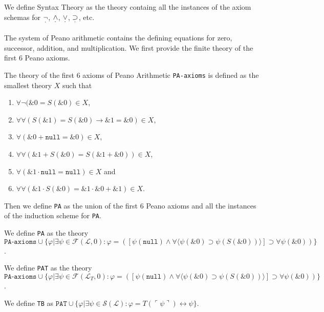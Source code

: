 \begin{definition}\label{def:Syntax-Theory}
  \leanok
  We define Syntax Theory as the theory containg all the instances of the axiom schemas for $\underset{^{\boldsymbol{\cdot}}}{\neg}$, $\underset{^{\boldsymbol{\cdot}}}{\wedge}$, $\underset{^{\boldsymbol{\cdot}}}{\vee}$, $\underset{^{\boldsymbol{\cdot}}}{\supset}$, etc.
\end{definition}

The system of Peano arithmetic contains the defining equations for zero, successor, addition, and multiplication. We first provide the finite theory of the first 6 Peano axioms.
\begin{definition}\label{def:PA-Axioms}
  \leanok
    The theory of the first 6 axioms of Peano Arithmetic \texttt{PA-axioms} is defined as the smallest theory $X$ such that
    \begin{enumerate}
        \item $\forall \neg (\&0 = S(\&0) \in X$, 
        \item $\forall \forall (S(\&1) = S(\&0) \rightarrow \&1 = \&0) \in X$,
        \item $\forall (\&0 + \texttt{null} = \&0) \in X$,
        \item $\forall \forall (\&1 + S(\&0) = S(\&1 + \&0)) \in X$,
        \item $\forall (\&1 \cdot \texttt{null} = \texttt{null}) \in X$ and
        \item $\forall  \forall (\&1 \cdot S(\&0) = \&1 \cdot \&0 + \&1) \in X$.
    \end{enumerate}
\end{definition}

Then we define \texttt{PA} as the union of the first 6 Peano axioms and all the instances of the induction scheme for \texttt{PA}.
\begin{definition}\label{def:PA}
  \leanok
  We define \texttt{PA} as the theory $\texttt{PA-axioms} \cup \{φ | ∃ψ \in \mathcal{F}(\mathcal{L},{0}) : φ = ([ψ(\texttt{null}) \wedge ∀\langle ψ(\&0) \supset ψ(S(\&0)) \rangle ] \supset ∀ψ(\&0))\}$.
\end{definition}

\begin{definition}\label{def:PAT}
  \leanok
    We define \texttt{PAT} as the theory $\texttt{PA-axioms} \cup \{φ | ∃ψ \in \mathcal{F}(\mathcal{L}_T,{0}) : φ = ([ψ(\texttt{null}) \wedge ∀\langle ψ(\&0) \supset ψ(S(\&0)) \rangle ] \supset ∀ψ(\&0))\}$.
\end{definition}

\begin{definition}[\texttt{TB}]\label{def:TB}
  \leanok
    We define \texttt{TB} as $\texttt{PAT} \cup \{φ | ∃ψ \in \mathcal{S}(\mathcal{L}) : φ = T(⌜ψ⌝) \leftrightarrow ψ\}$.
\end{definition}
